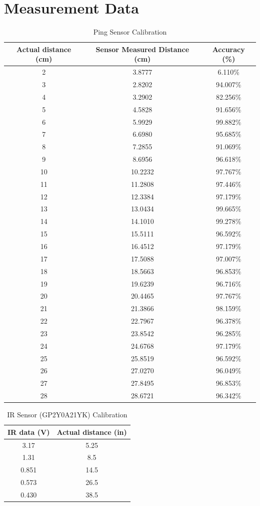 \documentclass[12pt]{article}
\begin{document}
\section{Measurement Data}
\begin{table}
  \centering
  \begin{tabular}{c|c|c}
    Actual distance (cm) & Sensor Measured Distance (cm) & Accuracy (\%) \\
    \hline
    2  & 3.8777 & 6.110\% \\
    3  & 2.8202 & 94.007\% \\
    4  & 3.2902 & 82.256\% \\
    5  & 4.5828 & 91.656\% \\
    6  & 5.9929 & 99.882\% \\
    7  & 6.6980 & 95.685\% \\
    8  & 7.2855 & 91.069\% \\
    9  & 8.6956 & 96.618\% \\
    10 & 10.2232 & 97.767\% \\
    11 & 11.2808 & 97.446\% \\
    12 & 12.3384 & 97.179\% \\
    13 & 13.0434 & 99.665\% \\
    14 & 14.1010 & 99.278\% \\
    15 & 15.5111 & 96.592\% \\
    16 & 16.4512 & 97.179\% \\
    17 & 17.5088 & 97.007\% \\
    18 & 18.5663 & 96.853\% \\
    19 & 19.6239 & 96.716\% \\
    20 & 20.4465 & 97.767\% \\
    21 & 21.3866 & 98.159\% \\
    22 & 22.7967 & 96.378\% \\
    23 & 23.8542 & 96.285\% \\
    24 & 24.6768 & 97.179\% \\
    25 & 25.8519 & 96.592\% \\
    26 & 27.0270 & 96.049\% \\
    27 & 27.8495 & 96.853\% \\
    28 & 28.6721 & 96.342\% \\
  \end{tabular}
  \caption{Ping Sensor Calibration}
  \label{tbl:ping-calib}
\end{table}

\begin{table}
  \centering
  \begin{tabular}{c|c}
    IR data (V) & Actual distance (in) \\
    \hline
    3.17 & 5.25 \\
    1.31 & 8.5 \\
    0.851 & 14.5 \\
    0.573 & 26.5 \\
    0.430 & 38.5 \\
  \end{tabular}
  \caption{IR Sensor (GP2Y0A21YK) Calibration}
  \label{tbl:ir-calib}
\end{table}
\end{document}
